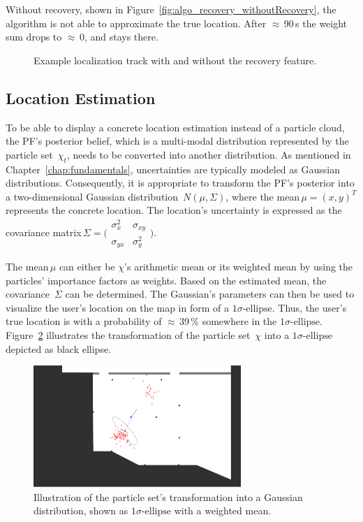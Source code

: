 Without recovery, shown in Figure~\ref{fig:algo_recovery_withoutRecovery}, the algorithm is not able to approximate the true location. After $\approx$\,90\,s the weight sum drops to $\approx$\,0, and stays there.




\begin{figure}
	
	\caption {Example localization track with and without the recovery feature.}
	\label{fig:algo_recovery}
\end{figure}

\subsection{Location Estimation}\label{sec:algo_locEstimation}
To be able to display a concrete location estimation instead of a particle cloud, the \acs{PF}'s posterior belief, which is a multi-modal distribution represented by the particle set~$\chi_t$, needs to be converted into another distribution. As mentioned in Chapter~\ref{chap:fundamentals}, uncertainties are typically modeled as Gaussian distributions. Consequently, it is appropriate to transform the \acs{PF}'s posterior into a two-dimensional Gaussian distribution~$N(\mu, \Sigma)$, where the mean\,$\mu = (x, y)^T$ represents the concrete location. The location's uncertainty is expressed as the covariance matrix\,$\Sigma = \bigl(\begin{smallmatrix} \sigma_{x}^2&\sigma_{xy}\\ \sigma_{yx}&\sigma_{y}^2 \end{smallmatrix} \bigr)$.

The mean\,$\mu$ can either be $\chi$'s arithmetic mean or its weighted mean by using the particles' importance factors as weights. Based on the estimated mean, the covariance~$\Sigma$ can be determined. The Gaussian's parameters can then be used to visualize the user's location on the map in form of a $1\sigma\text{-ellipse}$. Thus, the user's true location is with a probability of $\approx$\,39\,\% somewhere in the $1\sigma\text{-ellipse}$. Figure~\ref{fig:algo_sigellipse} illustrates the transformation of the particle set~$\chi$ into a  $1\sigma\text{-ellipse}$ depicted as black ellipse.

\begin{figure}
	\includegraphics[width=0.7\textwidth]{figures/sigellipse}
	\caption{Illustration of the particle set's transformation into a Gaussian distribution, shown as $1\sigma\text{-ellipse}$ with a weighted mean.}
	\label{fig:algo_sigellipse}
\end{figure}
